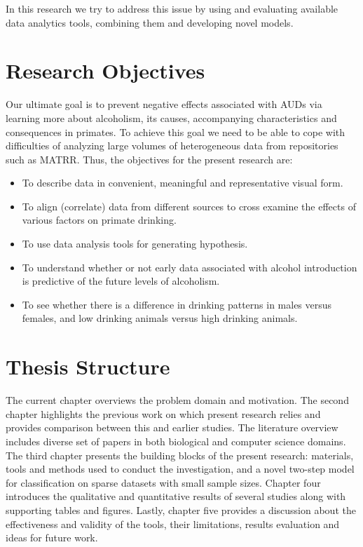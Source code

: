 In this research we try to address this issue by using and evaluating available data analytics tools, combining them and developing novel models. 

\section{Research Objectives}
Our ultimate goal is to prevent negative effects associated with AUDs via learning more about alcoholism, its causes, accompanying characteristics and consequences in primates. To achieve this goal we need to be able to cope with difficulties of analyzing large volumes of heterogeneous data from repositories such as MATRR. Thus, the objectives for the present research are:
\begin{itemize}
\item To describe data in convenient, meaningful and representative visual form.
\item To align (correlate) data from different sources to cross examine the effects of various factors on primate drinking.
\item To use data analysis tools for generating hypothesis.
\item To understand whether or not early data associated with alcohol introduction is predictive of the future levels of alcoholism. 
\item To see whether there is a difference in drinking patterns in males versus females, and low drinking animals versus high drinking animals.
\end{itemize} 


\section{Thesis Structure}
The current chapter overviews the problem domain and motivation. The second chapter highlights the previous work on which present research relies and provides comparison between this and earlier studies. The literature overview includes diverse set of papers in both biological and computer science domains. The third chapter presents the building blocks of the present research: materials, tools and methods used to conduct the investigation, and a  novel two-step model for classification on sparse datasets with small sample sizes. Chapter four introduces the qualitative and quantitative results of several studies along with supporting tables and figures. Lastly, chapter five provides a discussion about the effectiveness and validity of the tools,  their limitations, results evaluation and ideas for future work. 
